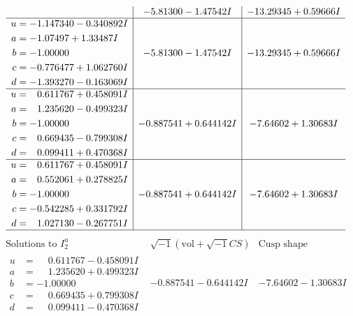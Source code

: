 \documentclass[1p]{elsarticle_modified}
\theoremstyle{definition}
\newcommand{\I}{\sqrt{-1}}
\begin{document}
$$\begin{array}{c|c|c}
 & -5.81300 - 1.47542 I & -13.29345 + 0.59666 I \\ \hline\begin{aligned}
u &= -1.147340 - 0.340892 I \\
a &= -1.07497 + 1.33487 I \\
b &= -1.00000\phantom{ +0.000000I} \\
c &= -0.776477 + 1.062760 I \\
d &= -1.393270 - 0.163069 I\end{aligned}
 & -5.81300 - 1.47542 I & -13.29345 + 0.59666 I \\ \hline\begin{aligned}
u &= \phantom{-}0.611767 + 0.458091 I \\
a &= \phantom{-}1.235620 - 0.499323 I \\
b &= -1.00000\phantom{ +0.000000I} \\
c &= \phantom{-}0.669435 - 0.799308 I \\
d &= \phantom{-}0.099411 + 0.470368 I\end{aligned}
 & -0.887541 + 0.644142 I & -7.64602 + 1.30683 I \\ \hline\begin{aligned}
u &= \phantom{-}0.611767 + 0.458091 I \\
a &= \phantom{-}0.552061 + 0.278825 I \\
b &= -1.00000\phantom{ +0.000000I} \\
c &= -0.542285 + 0.331792 I \\
d &= \phantom{-}1.027130 - 0.267751 I\end{aligned}
 & -0.887541 + 0.644142 I & -7.64602 + 1.30683 I\\
 \hline 
 \end{array}$$\newpage$$\begin{array}{c|c|c}  
\text{Solutions to }I^u_{2}& \I (\text{vol} + \sqrt{-1}CS) & \text{Cusp shape}\\
 \hline 
\begin{aligned}
u &= \phantom{-}0.611767 - 0.458091 I \\
a &= \phantom{-}1.235620 + 0.499323 I \\
b &= -1.00000\phantom{ +0.000000I} \\
c &= \phantom{-}0.669435 + 0.799308 I \\
d &= \phantom{-}0.099411 - 0.470368 I\end{aligned}
 & -0.887541 - 0.644142 I & -7.64602 - 1.30683 I \\ \hline\begin{aligned}

\end{aligned}
\end{array}$$
\end{document}
